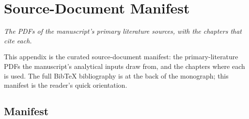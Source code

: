 
\chapter{Source-Document Manifest}
\label{ch:appx-refs-manifest}

\noindent\emph{The PDFs of the manuscript's primary literature
sources, with the chapters that cite each.}

This appendix is the curated source-document manifest: the
primary-literature PDFs the manuscript's analytical inputs draw
from, and the chapters where each is used.  The full BibTeX
bibliography is at the back of the monograph; this manifest is
the reader's quick orientation.

\section{Manifest}
\label{sec:refs-manifest}

